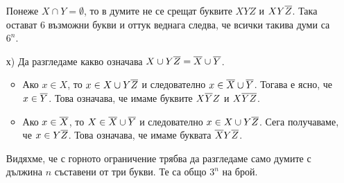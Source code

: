 \begin{solution}
\begin{enumerate}[a)]
    Понеже $X \cap Y = \emptyset$, то в думите не се срещат буквите $XYZ$ и $XY\overline{Z}$.
    Така остават $6$ възможни букви и оттук веднага следва, че всички такива думи са $6^n$.    
  \item[х)]
    Да разгледаме какво означава $X\cup Y\overline{Z} = \overline{X} \cup \overline{Y}$.
    \begin{itemize}
    \item 
      Ако $x \in X$, то $x \in X \cup Y\overline{Z}$ и следователно $x \in \overline{X} \cup \overline{Y}$.
      Тогава е ясно, че $x \in \overline{Y}$. Това означава, че имаме буквите $X\overline{Y}Z$ и $X\overline{Y}\overline{Z}$.
    \item
      Ако $x \in \overline{X}$, то $X \in \overline{X} \cup \overline{Y}$ и следователно $x \in X \cup Y\overline{Z}$.
      Сега получаваме, че $x \in Y\overline{Z}$. Това означава, че имаме буквата $\overline{X}Y\overline{Z}$.
    \end{itemize}
    Видяхме, че с горното ограничение трябва да разгледаме само думите с дължина $n$ съставени от три букви.
    Те са общо $3^n$ на брой.
  \end{enumerate}
\end{solution}


